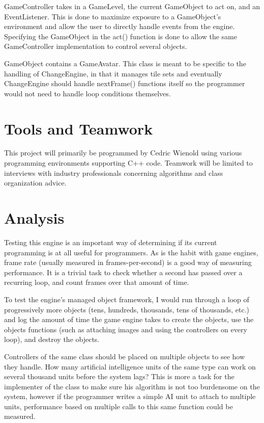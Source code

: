 \documentclass[12pt]{article}
\begin{document}
GameController takes in a GameLevel, the current GameObject to act on, and an EventListener. This is done to maximize exposure to a GameObject's environment and allow the user to directly handle events from the engine. Specifying the GameObject in the act() function is done to allow the same GameController implementation to control several objects.

GameObject contains a GameAvatar. This class is meant to be specific to the handling of ChangeEngine, in that it manages tile sets and eventually ChangeEngine should handle nextFrame() functions itself so the programmer would not need to handle loop conditions themselves.


  \section{Tools and Teamwork}
    This project will primarily be programmed by Cedric Wienold using various programming environments supporting C++ code. Teamwork will be limited to interviews with industry professionals concerning algorithms and class organization advice.

  \section{Analysis}
    Testing this engine is an important way of determining if its current programming is at all useful for programmers. As is the habit with game engines, frame rate (usually measured in frames-per-second) is a good way of measuring performance. It is a trivial task to check whether a second has passed over a recurring loop, and count frames over that amount of time.

    To test the engine's managed object framework, I would run through a loop of progressively more objects (tens, hundreds, thousands, tens of thousands, etc.) and log the amount of time the game engine takes to create the objects, use the objects functions (such as attaching images and using the controllers on every loop), and destroy the objects.

    Controllers of the same class should be placed on multiple objects to see how they handle. How many artificial intelligence units of the same type can work on several thousand units before the system lags? This is more a task for the implementer of the class to make sure his algorithm is not too burdensome on the system, however if the programmer writes a simple AI unit to attach to multiple units, performance based on multiple calls to this same function could be measured.
\end{document}
